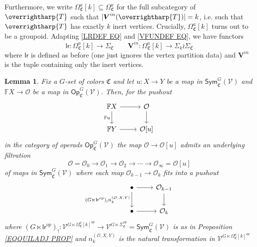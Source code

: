 \documentclass[a4paper,10pt
,draft
]{article}%
\numberwithin{equation}{section}
\numberwithin{figure}{section}
\newtheorem{lemma}[equation]{Lemma}%
\theoremstyle{definition} %
\newcommand{\vect}[1]{\text{\overrightharp{\ensuremath{#1}}}}
\newcommand{\V}{\ensuremath{\mathcal V}}
\renewcommand{\O}{\ensuremath{\mathcal O}}
\newcommand{\1}{\ensuremath{\mathbbm 1}}%
\begin{document}
Furthermore, we write
$\Omega_{\mathfrak C}^a[k] \subseteq \Omega_{\mathfrak C}^a$
for the full subcategory of $\vect{T}$ such that 
$|\boldsymbol{V}^{in}(\vect{T})| = k$,
i.e. such that $\vect{T}$ has exactly $k$ inert vertices.
Crucially, $\Omega^a_{\mathfrak{C}}[k]$
turns out to be a groupoid.
%
Adapting \eqref{LRDEF EQ} and \eqref{VFUNDEF EQ}, 
we have functors
\[
\mathsf{lr} \colon
\Omega^a_{\mathfrak{C}}[k]
\to
\Sigma_{\mathfrak{C}}
	\qquad
\boldsymbol{V}^{in} \colon
\Omega^a_{\mathfrak{C}}[k]
\to
\Sigma_k \wr \Sigma_{\mathfrak{C}}
\]
where $\mathsf{lr}$ is defined as before (one just ignores the vertex partition data)
and $\boldsymbol{V}^{in}$ is the tuple containing only the inert vertices.



\begin{lemma}
Fix a $G$-set of colors $\mathfrak{C}$ and let
$u\colon X \to Y$ be a map in $\mathsf{Sym}^G_{\mathfrak{C}}(\V)$
and
$\mathbb{F} X \to \O$ be a map in $\mathsf{Op}^G_{\mathfrak{C}}(\V)$.
Then, for the pushout 
\begin{equation}\label{OURE EQ}
\begin{tikzcd}
	\mathbb F X \arrow[d, "\mathbb{F}u"'] \arrow[r]
&
	\O \arrow[d]
\\
	\mathbb F Y \arrow[r]
&
\O[u]
\end{tikzcd}
\end{equation}
in the category of operads $\mathsf{Op}^G_{\mathfrak{C}}(\V)$
the map $\O \to \O[u]$ admits an underlying filtration
\begin{equation}\label{OUFILRE EQ}
\O = \O_0 \to \O_1 \to \O_2 \to \cdots \to \O_{\infty} = \O[u]
\end{equation}
of maps in $\mathsf{Sym}^G_{\mathfrak{C}}(\V)$ 
where each map $\O_{k-1} \to \O_k$ fits into a pushout
\begin{equation}\label{OUPUSHRE EQ}
\begin{tikzcd}
	\bullet 
	\arrow{d}[swap]{\left(G \ltimes \mathsf{lr}^{op}\right)_!
	n_k^{(\O,X,Y)}}
	 \arrow[r]
&
	\O_{k-1} \arrow[d]
\\
	\bullet \arrow[r]
&
	\O_k
\end{tikzcd}
\end{equation}
where 
$
\left(G \ltimes \mathsf{lr}^{op}\right)_! \colon
\mathcal{V}^{G \ltimes \Omega^a_{\mathfrak{C}}[k]^{op}}
\to
\mathcal{V}^{G \ltimes \Sigma_{\mathfrak{C}}^{op}}
=
\mathsf{Sym}^G_{\mathfrak{C}}(\V)
$
is as in Proposition \ref{EQQUILADJ PROP}
and $n_k^{(\O,X,Y)}$ is the natural transformation in 
$\mathcal{V}^{G \ltimes \Omega^a_{\mathfrak{C}}[k]^{op}}$

\end{lemma}
\end{document}
